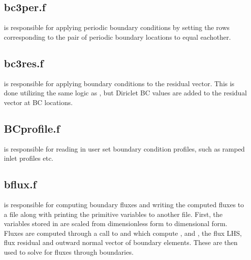 \documentclass[./]{subfiles}
\begin{document}
\subsection{bc3per.f}
 is responsible for applying periodic boundary conditions by setting the rows corresponding to the pair of periodic boundary locations to equal eachother.

\subsection{bc3res.f}
 is responsible for applying boundary conditions to the residual vector. This is done utilizing the same logic as , but Diriclet BC values are added to the residual vector at BC locations.

\subsection{BCprofile.f}
 is responsible for reading in user set boundary condition profiles, such as ramped inlet profiles etc. 

\subsection{bflux.f }
 is responsible for computing boundary fluxes and writing the computed fluxes to a file along with printing the primitive variables to another file. First, the variables stored in  are scaled from dimensionless form to dimensional form. Fluxes are computed through a call to  and  which compute ,  and , the flux LHS, flux residual and outward normal vector of boundary elements. These are then used to solve for fluxes through boundaries.
\end{document}

